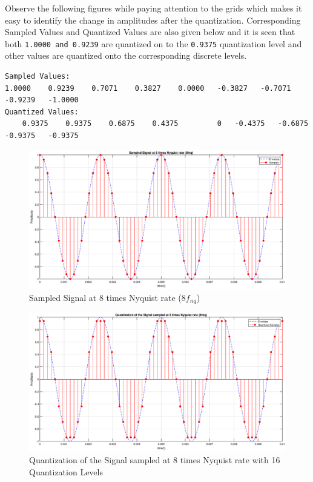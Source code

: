 \documentclass[a4paper,11pt]{article}%
\begin{document}
Observe the following figures while paying attention to the grids which makes it easy to identify the change in amplitudes after the quantization. Corresponding  Sampled Values and Quantized Values are also given below and it is seen that both {\tt 1.0000  and  0.9239} are quantized on to the {\tt 0.9375} quantization level and other values are quantized onto the corresponding discrete levels.

\begin{verbatim}
Sampled Values:	
1.0000    0.9239    0.7071    0.3827    0.0000   -0.3827   -0.7071   -0.9239   -1.0000
Quantized Values:
	0.9375    0.9375    0.6875    0.4375         0   -0.4375   -0.6875   -0.9375   -0.9375
\end{verbatim}

\begin{figure}[!h]
	\centering
	\includegraphics[scale=0.45]{figures/q71}
	\caption{Sampled Signal at 8 times Nyquist rate ($8f_{nq}$)}
\end{figure}

\begin{figure}[!h]
	\centering
	\includegraphics[scale=0.45]{figures/q72}
		\caption{Quantization of the Signal sampled at 8 times Nyquist rate with 16 Quantization Levels}
		\label{l16}
\end{figure}
\end{document}
